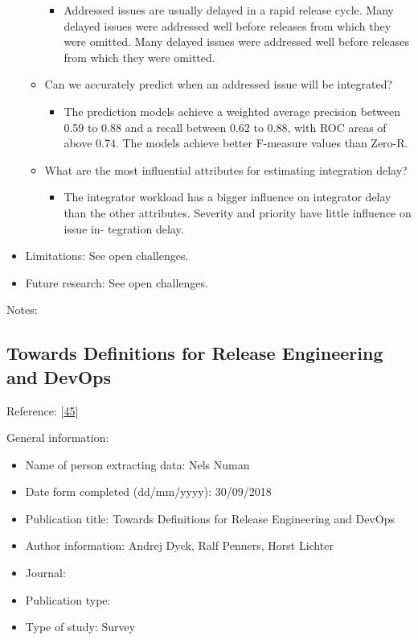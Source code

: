 \documentclass[]{book}
\providecommand{\tightlist}{%
  \setlength{\itemsep}{0pt}\setlength{\parskip}{0pt}}
\begin{document}
\begin{itemize}
\begin{itemize}
    \begin{itemize}
    \tightlist
    \item
      Addressed issues are usually delayed in a rapid release cycle.
      Many delayed issues were addressed well before releases from which
      they were omitted. Many delayed issues were addressed well before
      releases from which they were omitted.
    \end{itemize}
  \item
    Can we accurately predict when an addressed issue will be
    integrated?

    \begin{itemize}
    \tightlist
    \item
      The prediction models achieve a weighted average precision between
      0.59 to 0.88 and a recall between 0.62 to 0.88, with ROC areas of
      above 0.74. The models achieve better F-measure values than
      Zero-R.
    \end{itemize}
  \item
    What are the most influential attributes for estimating integration
    delay?

    \begin{itemize}
    \tightlist
    \item
      The integrator workload has a bigger influence on integrator delay
      than the other attributes. Severity and priority have little
      influence on issue in- tegration delay.
    \end{itemize}
  \end{itemize}
\item
  Limitations: See open challenges.
\item
  Future research: See open challenges.
\end{itemize}

Notes:

\subsection{Towards Definitions for Release Engineering and
DevOps}\label{towards-definitions-for-release-engineering-and-devops}

Reference: {[}\protect\hyperlink{ref-dyck2015a}{45}{]}

General information:

\begin{itemize}
\tightlist
\item
  Name of person extracting data: Nels Numan
\item
  Date form completed (dd/mm/yyyy): 30/09/2018
\item
  Publication title: Towards Definitions for Release Engineering and
  DevOps
\item
  Author information: Andrej Dyck, Ralf Penners, Horst Lichter
\item
  Journal:
\item
  Publication type:
\item
  Type of study: Survey
\end{itemize}
\end{document}
